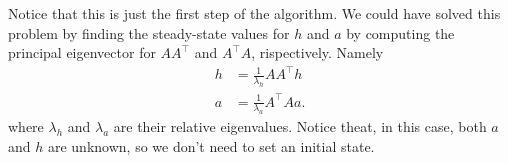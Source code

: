 \begin{enumerate}
  Notice that this is just the first step of the algorithm. We could have solved
  this problem by finding the steady-state values for $h$ and $a$ by computing
  the principal eigenvector for $AA^\top$ and $A^\top A$, rispectively. Namely
  \begin{align*}
    h &= \frac{1}{\lambda_h}AA^\top h \\
    a &= \frac{1}{\lambda_a}A^\top A a.
  \end{align*}
  where $\lambda_h$ and $\lambda_a$ are their relative eigenvalues. Notice
  theat, in this case, both $a$ and $h$ are unknown, so we don't need to set an
  initial state.

\end{enumerate}
